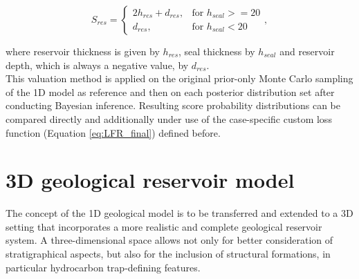 			\begin{equation}\label{eq:1D_score_system}
			S_{res} = 
			\begin{cases}
			2h_{res} + d_{res}, & \text{for } h_{seal} >= 20  \\
			d_{res}, & \text{for } h_{seal} < 20
			\end{cases},
			\end{equation}
			
			where reservoir thickness is given by $h_{res}$, seal thickness by $h_{seal}$ and reservoir depth, which is always a negative value, by $d_{res}$.\\
			This valuation method is applied on the original prior-only Monte Carlo sampling of the 1D model as reference and then on each posterior distribution set after conducting Bayesian inference. Resulting score probability distributions can be compared directly and additionally under use of the case-specific custom loss function (Equation \ref{eq:LFR_final}) defined before. 
		
		\section{3D geological reservoir model}\label{sec:3D_model}
		The concept of the 1D geological model is to be transferred and extended to a 3D setting that incorporates a more realistic and complete geological reservoir system. A three-dimensional space allows not only for better consideration of stratigraphical aspects, but also for the inclusion of structural formations, in particular hydrocarbon trap-defining features.
		
